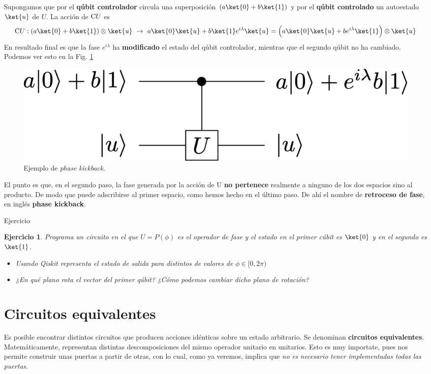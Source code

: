 \documentclass[a4paper,11pt]{book} %
\newtheorem{ejercicio_contador}{Ejercicio}
\newcommand{\Ejercicio}[1]{
		\begin{mybox_gray}{Ejercicio} 
			\begin{ejercicio_contador}
				 #1 
			\end{ejercicio_contador} 
		\end{mybox_gray}
	}
\numberwithin{equation}{chapter}
\newcommand{\cg}[1]{{\rm C}#1}
\begin{document}
Supongamos que por el \textbf{qúbit controlador} circula una superposición $(a\ket{0}+b\ket{1})$ y por el \textbf{qúbit controlado} un autoestado $\ket{u}$ de $U$.  La acción de $\cg{U}$ es
$$
\cg{U}: (a\ket{0} + b\ket{1})\otimes \ket{u} ~\to ~ a\ket{0}\ket{u} + b \ket{1}e^{i\lambda}\ket{u}  = \left( a\ket{0}\ket{u} + be^{i\lambda} \ket{1} \rule{0mm}{4mm} \right)\otimes \ket{u}
$$
En resultado final es que la fase $e^{i\lambda}$ ha \textbf{modificado} el estado del qúbit controlador, mientras que el segundo qúbit no ha cambiado. Podemos ver esto en la Fig. \ref{Fig_elementos_phase_kickback.}

		\begin{figure}[H]
		\centering 
		\includegraphics[width=0.45\linewidth]{Figuras/Fig_elementos_phase_kickback}
		\caption{Ejemplo de \textit{phase kickback}.}
		\label{Fig_elementos_phase_kickback.}
		\end{figure}

El punto es que, en el segundo paso, la fase generada por la acción de U \textbf{no pertenece} realmente a ninguno de los dos espacios sino al producto. De modo que puede adscribirse al primer espacio, como hemos hecho en el último paso. De ahí el nombre de \textbf{retroceso de fase}, en inglés \textbf{phase kickback}.

	\Ejercicio{Programa un circuito en el que  $U = P(\phi)$ es el operador de fase y el estado en el primer cúbit es $\ket{0}$ y en el segundo es $\ket{1}$. 
	\begin{itemize}
		\item[a)] Usando Qiskit representa el estado de salida para distintos de valores de $\phi \in [0, 2 \pi )$
		
		\item[b)] ¿En qué plano rota el vector del primer qúbit? ¿Cómo podemos cambiar dicho plano de rotación?
	\end{itemize}
	}	   
    


	\section{Circuitos equivalentes}

Es posible encontrar distintos circuitos que producen acciones idénticas sobre un estado arbitrario. Se denominan \textbf{circuitos equivalentes}. Matemáticamente, representan distintas descomposiciones del mismo operador unitario en unitarios. Esto es muy importate, pues nos permite construir unas puertas a partir de otras, con lo cual, como ya veremos, implica que  \textit{no es necesario tener implementadas todas las puertas.}
\end{document}
